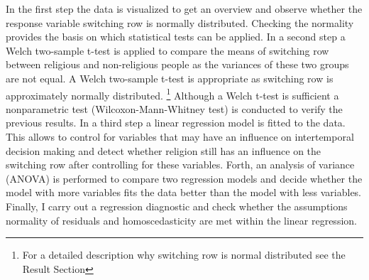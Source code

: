 \documentclass[10pt,a4paper]{article}
\begin{document}



In the first step the data is visualized to get an overview and observe whether the response variable switching row is normally distributed. Checking the normality provides the basis on which statistical tests can be applied. 
In a second step a Welch two-sample t-test is applied to compare the means of switching row between religious and non-religious people as the variances of these two groups are not equal. A Welch two-sample t-test is appropriate as switching row is approximately normally distributed. \footnote{For a detailed description why switching row is normal distributed see the Result Section} Although a Welch t-test is sufficient a nonparametric test (Wilcoxon-Mann-Whitney test) is conducted to verify the previous results.
In a third step a linear regression model is fitted to the data. This allows to control for variables that may have an influence on intertemporal decision making and detect whether religion still has an influence on the switching row after controlling for these variables. Forth, an analysis of variance (ANOVA) is performed to compare two regression models and decide whether the  model with more variables fits the data better than the model with less variables. Finally, I carry out a regression diagnostic and check whether the assumptions normality of residuals and  homoscedasticity are met within the linear regression.\\  
\end{document}

